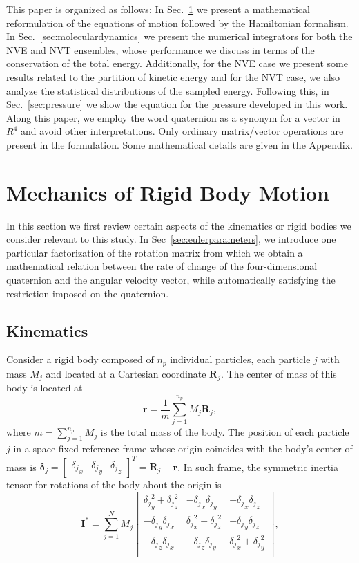 \documentclass[aip,jcp,reprint,amsmath,amssymb]{revtex4-1}
\newcommand{\mt}[1]{\boldsymbol{\mathbf{#1}}}           %
\newcommand{\vt}[1]{\boldsymbol{\mathbf{#1}}}           %
\newcommand{\tr}[1]{#1^T}                               %
\begin{document}
This paper is organized as follows: In Sec.~\ref{sec:mechanics} we present a mathematical reformulation of the equations of motion followed by the Hamiltonian formalism. In Sec.~\ref{sec:moleculardynamics} we present the numerical integrators for both the NVE and NVT ensembles, whose performance we discuss in terms of the conservation of the total energy. Additionally, for the NVE case we present some results related to the partition of kinetic energy and for the NVT case, we also analyze the statistical distributions of the sampled energy. Following this, in Sec.~\ref{sec:pressure} we show the equation for the pressure developed in this work. Along this paper, we employ the word quaternion as a synonym for a vector in $R^4$ and avoid other interpretations. Only ordinary matrix/vector operations are present in the formulation. Some mathematical details are given in the Appendix.

\section{Mechanics of Rigid Body Motion}
\label{sec:mechanics}

In this section we first review certain aspects of the kinematics or rigid bodies we consider relevant to this study. In Sec~\ref{sec:eulerparameters}, we introduce one particular factorization of the rotation matrix from which we obtain a mathematical relation between the rate of change of the four-dimensional quaternion and the angular velocity vector, while automatically satisfying the restriction imposed on the quaternion.

\subsection{Kinematics}

Consider a rigid body composed of $n_p$ individual particles, each particle $j$ with mass $M_j$ and located at a Cartesian coordinate $\vt R_j$. The center of mass of this body is located at
\[
\vt r = \frac{1}{m}\sum_{j=1}^{n_p} M_j {\vt R}_j,
\]
where $m = \sum_{j=1}^{n_p} M_j$ is the total mass of the body. The position of each particle $j$ in a space-fixed reference frame whose origin coincides with the body's center of mass is ${\vt \delta}_j = \tr{ [\begin{array}{ccc} {\delta_j}_x & {\delta_j}_y & {\delta_j}_z \end{array}]} = {\vt R}_j - {\vt r}$. In such frame, the symmetric inertia tensor for rotations of the body about the origin is\cite{Goldstein2002}
\[
{\mt I}^\ast = \sum_{j=1}^N M_j \left[ \begin{array}{ccc}
{\delta_j}_y^2 + {\delta_j}_z^2 & -{\delta_j}_x {\delta_j}_y & -{\delta_j}_x {\delta_j}_z \\
-{\delta_j}_y {\delta_j}_x & {\delta_j}_x^2 + {\delta_j}_z^2 & -{\delta_j}_y {\delta_j}_z \\
-{\delta_j}_z {\delta_j}_x & -{\delta_j}_z {\delta_j}_y & {\delta_j}_x^2 + {\delta_j}_y^2 \\
\end{array} \right],
\]
\end{document}
